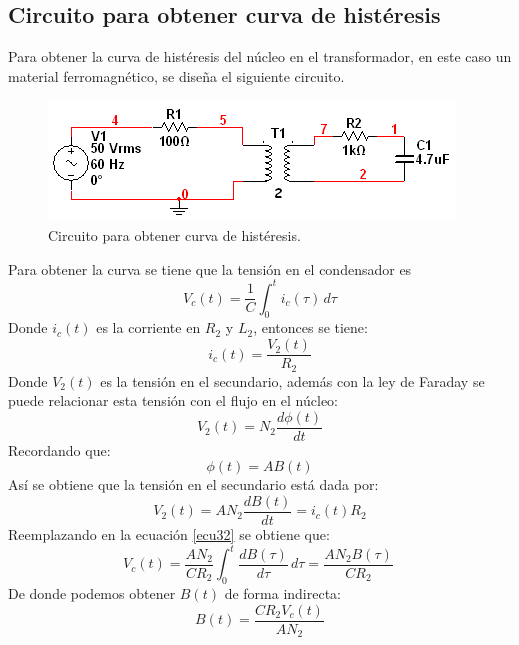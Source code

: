 \documentclass[twocolumn]{IEEEtran}
\begin{document}
\subsection{Circuito para obtener curva de histéresis}
\noindent
Para obtener la curva de histéresis del núcleo en el transformador, en este caso un material ferromagnético, se diseña el siguiente circuito.
\begin{figure}[H]
	\centering
		\includegraphics[scale=0.6]{circ2.PNG}
	\caption{Circuito para obtener curva de histéresis.}
	\label{fig11}
\end{figure}
\noindent
Para obtener la curva se tiene que la tensión en el condensador es
\begin{equation}
V_c(t)=\frac{1}{C}\displaystyle\int_{0}^{t} i_c(\tau)\, d\tau
\label{ecu32}
\end{equation}
\noindent
Donde $i_c(t)$ es la corriente en $R_2$ y $L_2$, entonces se tiene:
\begin{equation}
i_c(t)=\frac{V_2(t)}{R_2}
\label{ecu33}
\end{equation}
\noindent
Donde $V_2(t)$ es la tensión en el secundario, además con la ley de Faraday se puede relacionar esta tensión con el flujo en el núcleo:
\begin{equation}
V_2(t)=N_2\frac{d \phi(t)}{dt}
\label{ecu34}
\end{equation}
\noindent
Recordando que:
\begin{equation}
\phi(t)=A B(t)
\label{ecu35}
\end{equation}
\noindent
Así se obtiene que la tensión en el secundario está dada por:
\begin{equation}
V_2(t)=AN_2\frac{dB(t)}{dt}=i_c(t)R_2
\label{ecu36}
\end{equation}
\noindent
Reemplazando en la ecuación  \ref{ecu32} se obtiene que:
\begin{equation}
V_c(t)=\frac{AN_2}{CR_2}\displaystyle\int_{0}^{t} \frac{dB(\tau)}{d\tau}\, d\tau=\frac{AN_2B(\tau)}{CR_2}\
\label{ecu37}
\end{equation}
\noindent
De donde podemos obtener $B(t)$ de forma indirecta:
\begin{equation}
B(t)=\frac{CR_2 V_c(t)}{AN_2}
\label{ecu38}
\end{equation}
\end{document}
